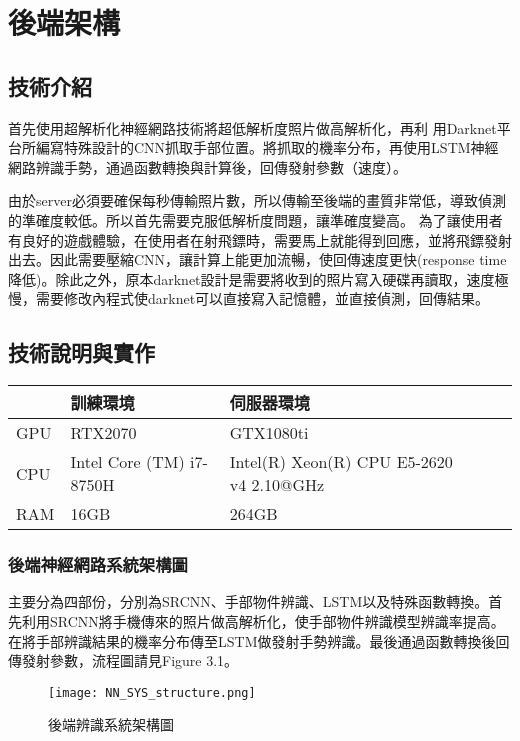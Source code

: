 \chapter{後端架構}
\section{技術介紹}
首先使用超解析化神經網路技術將超低解析度照片做高解析化，再利 用Darknet平台所編寫特殊設計的CNN抓取手部位置。將抓取的機率分布，再使用LSTM神經網路辨識手勢，通過函數轉換與計算後，回傳發射參數（速度）。

由於server必須要確保每秒傳輸照片數，所以傳輸至後端的畫質非常低，導致偵測的準確度較低。所以首先需要克服低解析度問題，讓準確度變高。
為了讓使用者有良好的遊戲體驗，在使用者在射飛鏢時，需要馬上就能得到回應，並將飛鏢發射出去。因此需要壓縮CNN，讓計算上能更加流暢，使回傳速度更快(response time降低)。除此之外，原本darknet設計是需要將收到的照片寫入硬碟再讀取，速度極慢，需要修改內程式使darknet可以直接寫入記憶體，並直接偵測，回傳結果。


\section{技術說明與實作}


\begin{table}[]
\begin{tabular}{|l|l|l|l|l|}
\hline
    & 訓練環境                 & 伺服器環境                        \\\hline
GPU & RTX2070                  & GTX1080ti                                     \\\hline
CPU & Intel Core (TM) i7-8750H & Intel(R) Xeon(R) CPU E5-2620 v4  2.10@GHz     \\\hline
RAM & 16GB                     & 264GB                                   
\\\hline
\end{tabular}
\end{table}


\subsection{後端神經網路系統架構圖}

主要分為四部份，分別為SRCNN、手部物件辨識、LSTM以及特殊函數轉換。首先利用SRCNN將手機傳來的照片做高解析化，使手部物件辨識模型辨識率提高。在將手部辨識結果的機率分布傳至LSTM做發射手勢辨識。最後通過函數轉換後回傳發射參數，流程圖請見Figure 3.1。

\begin{figure}[H]
    \centering
    \texttt{[image: NN\_SYS\_structure.png]}
    \caption{後端辨識系統架構圖}
    \label{fig:後端辨識系統架構圖}
\end{figure}

